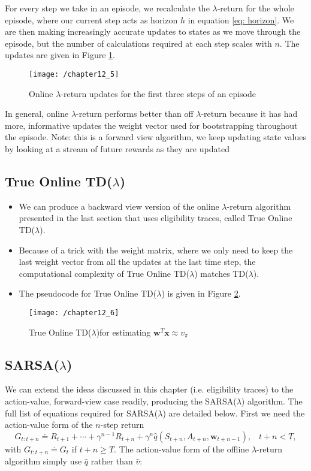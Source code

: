 For every step we take in an episode, we recalculate the $\lambda$-return for the whole episode, where our current step acts as horizon $h$ in equation \ref{eq: horizon}. We are then making increasingly accurate updates to states as we move through the episode, but the number of calculations required at each step scales with $n$. The updates are given in Figure \ref{fig: 12_5}.
\begin{figure}
	\centering
	\texttt{[image: /chapter12\_5]}
	\caption{Online $\lambda$-return updates for the first three steps of an episode}
	\label{fig: 12_5}
\end{figure}

In general, online $\lambda$-return performs better than off $\lambda$-return because it has had more, informative updates the weight vector used for bootstrapping throughout the episode. Note: this is a forward view algorithm, we keep updating state values by looking at a stream of future rewards as they are updated 

\subsection{True Online TD($\lambda$)}
\begin{itemize}
\item We can produce a backward view version of the online $\lambda$-return algorithm presented in the last section that uses eligibility traces, called True Online TD($\lambda$).
\item Because of a trick with the weight matrix, where we only need to keep the last weight vector from all the updates at the last time step, the computational complexity of True Online TD($\lambda$) matches TD($\lambda$).
\item The pseudocode for True Online TD($\lambda$) is given in Figure \ref{fig: 12_6}.
\end{itemize}
\begin{figure}
	\centering
	\texttt{[image: /chapter12\_6]}
	\caption{True Online TD($\lambda$)for estimating $\textbf{w}^T\textbf{x} \approx v_\pi$}
	\label{fig: 12_6}
\end{figure}

\subsection{SARSA($\lambda$)}
We can extend the ideas discussed in this chapter (i.e. eligibility traces) to the action-value, forward-view case readily, producing the SARSA($\lambda$) algorithm. The full list of equations required for SARSA($\lambda$) are detailed below. First we need the action-value form of the $n$-step return
\begin{equation}
G_{t:t+n} \doteq R_{t+1} + \cdots + \gamma^{n-1} R_{t+n} + \gamma^n \hat{q}(S_{t+n}, A_{t+n}, \textbf{w}_{t+n-1}), \; \; \; t+n < T,
\end{equation}
with $G_{t:t+n} \doteq G_t$ if $t+n \geq T$. The action-value form of the offline $\lambda$-return algorithm simply use $\hat{q}$ rather than $\hat{v}$:

